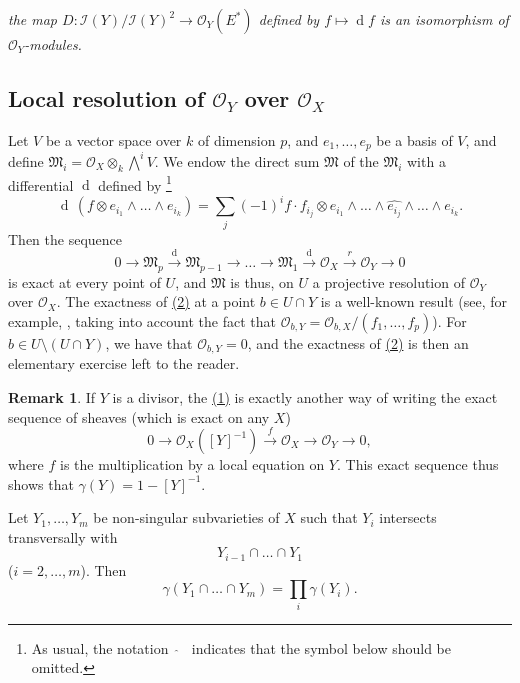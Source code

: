 \documentclass{article}
\theoremstyle{plain}
\newenvironment{proposition}[1]
    {\renewcommand\theinnerproposition{#1}\innerproposition}
    {\endinnerproposition}
\theoremstyle{definition}
\newtheorem*{remark}{Remark}
\newcommand{\scr}[1]{{\mathscr{#1}}}
\newcommand{\dd}{\operatorname{d}\!}
\newcommand{\oldpage}[1]{\marginpar{\footnotesize$\Big\vert$ \textit{p.~#1}}}
\begin{document}
\medskip

\emph{the map $D\colon\scr{I}(Y)/\scr{I}(Y)^2 \to \scr{O}_Y(E^*)$ defined by $f\mapsto\dd f$ is an isomorphism of $\scr{O}_Y$-modules.}


\subsection{Local resolution of \texorpdfstring{$\scr{O}_Y$}{O_Y} over \texorpdfstring{$\scr{O}_X$}{O_X}}
\label{subsection10c}

Let $V$ be a vector space over $k$ of dimension $p$, and $e_1,\ldots,e_p$ be a basis of $V$, and define $\mathfrak{M}_i = \scr{O}_X\otimes_k\bigwedge\nolimits^i V$.
We endow the direct sum $\mathfrak{M}$ of the $\mathfrak{M}_i$ with a differential $\dd$ defined by
\footnote{As usual, the notation $\,\,\widehat{\,}\,\,\,$ indicates that the symbol below should be omitted.}
\[
  \dd\,(f\otimes e_{i_1}\wedge\ldots\wedge e_{i_k})
  = \sum_j (-1)^i f\cdot f_{i_j}\otimes e_{i_1}\wedge\ldots\wedge \widehat{e_{i_j}} \wedge\ldots\wedge e_{i_k}.
\]
Then the sequence
\[
\label{section10cequation2}
  0 \to \mathfrak{M}_p \xrightarrow{\mathrm{d}} \mathfrak{M}_{p-1} \to \ldots \to \mathfrak{M}_1 \xrightarrow{\mathrm{d}} \scr{O}_X \xrightarrow{r} \scr{O}_Y \to 0
  \tag{2}
\]
is exact at every point of $U$, and $\mathfrak{M}$ is thus, on $U$ a
\oldpage{121}
projective resolution of $\scr{O}_Y$ over $\scr{O}_X$.
The exactness of \hyperref[section10cequation2]{(2)} at a point $b\in U\cap Y$ is a well-known result (see, for example, \cite[proposition~4.3, p.~151]{3}, taking into account the fact that $\scr{O}_{b,Y}=\scr{O}_{b,X}/(f_1,\ldots,f_p)$).
For $b\in U\setminus(U\cap Y)$, we have that $\scr{O}_{b,Y}=0$, and the exactness of \hyperref[section10cequation2]{(2)} is then an elementary exercise left to the reader.

\begin{remark}
  If $Y$ is a divisor, the \hyperref[section10aequation1]{(1)} is exactly another way of writing the exact sequence of sheaves (which is exact on any $X$)
  \[
  \label{equation3}
    0 \to \scr{O}_X([Y]^{-1}) \xrightarrow{f} \scr{O}_X \to \scr{O}_Y \to 0,
    \tag{3}
  \]
  where $f$ is the multiplication by a local equation on $Y$.
  This exact sequence thus shows that $\gamma(Y)=1-[Y]^{-1}$.
\end{remark}

\begin{proposition}{11}
\label{proposition11}
  Let $Y_1,\ldots,Y_m$ be non-singular subvarieties of $X$ such that $Y_i$ intersects transversally with
  \[
    Y_{i-1} \cap\ldots\cap Y_1
  \]
  ($i=2,\ldots,m$).
  Then
  \[
    \gamma(Y_1\cap\ldots\cap Y_m) = \prod_i\gamma(Y_i).
  \]
\end{proposition}
\end{document}
